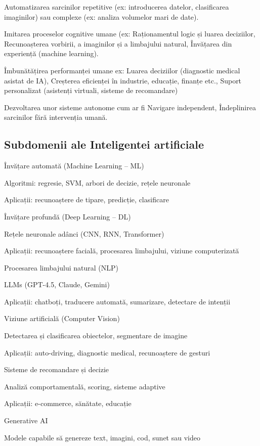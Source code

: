 \documentclass[12pt]{article}
\begin{document}
Automatizarea sarcinilor repetitive (ex: introducerea datelor, clasificarea imaginilor) sau complexe  (ex: analiza volumelor mari de date).

Imitarea proceselor cognitive umane (ex: Raționamentul logic și luarea deciziilor, Recunoașterea vorbirii, a imaginilor și a limbajului natural, Învățarea din experiență (machine learning).

Îmbunătățirea performanței umane ex: Luarea deciziilor (diagnostic medical asistat de IA), Creșterea eficienței în industrie, educație, finanțe etc., Suport personalizat (asistenți virtuali, sisteme de recomandare)

Dezvoltarea unor sisteme autonome cum ar fi Navigare independent, Îndeplinirea sarcinilor fără intervenția umană.

\subsection*{Subdomenii ale Inteligentei artificiale}

Învățare automată (Machine Learning – ML)

Algoritmi: regresie, SVM, arbori de decizie, rețele neuronale

Aplicații: recunoaștere de tipare, predicție, clasificare

Învățare profundă (Deep Learning – DL)

Rețele neuronale adânci (CNN, RNN, Transformer)

Aplicații: recunoaștere facială, procesarea limbajului, viziune computerizată

Procesarea limbajului natural (NLP)

LLMs (GPT-4.5, Claude, Gemini)

Aplicații: chatboți, traducere automată, sumarizare, detectare de intenții

Viziune artificială (Computer Vision)

Detectarea și clasificarea obiectelor, segmentare de imagine

Aplicații: auto-driving, diagnostic medical, recunoaștere de gesturi

Sisteme de recomandare și decizie

Analiză comportamentală, scoring, sisteme adaptive

Aplicații: e-commerce, sănătate, educație

Generative AI

Modele capabile să genereze text, imagini, cod, sunet sau video
\end{document}
